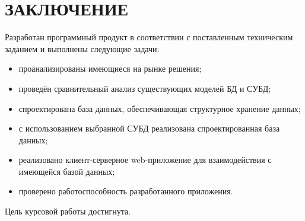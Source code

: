 \chapter*{\hfill{}ЗАКЛЮЧЕНИЕ\hfill{}}%
\label{cha:zakliuchenie}

Разработан программный продукт в соответствии с поставленным техническим заданием и выполнены следующие задачи:
\begin{itemize}
    \item проанализированы имеющиеся на рынке решения;
    \item проведён сравнительный анализ существующих моделей БД и СУБД;
    \item спроектирована база данных, обеспечивающая структурное хранение данных;
    \item с использованием выбранной СУБД реализована спроектированная база данных;
    \item реализовано клиент-серверное web-приложение для взаимодействия с имеющейся базой данных;
    \item проверено работоспособность разработанного приложения.
\end{itemize}

Цель курсовой работы достигнута.
